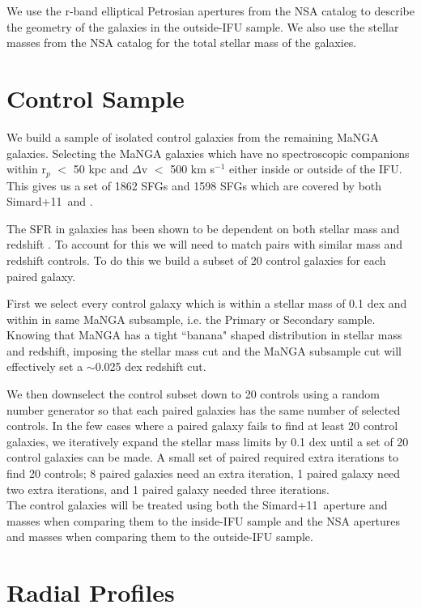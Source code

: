 \documentclass[iop,revtex4,twocolumn,apj,numberedappendix,appendixfloats]{emulateapj}
\newcommand{\simard}{Simard+11}
\begin{document}
We use the r-band elliptical Petrosian apertures from the NSA catalog to describe the geometry of the galaxies in the outside-IFU sample. We also use the stellar masses from the NSA catalog for the total stellar mass of the galaxies. 

\section{Control Sample}\label{sec:control}
We build a sample of isolated control galaxies from the remaining MaNGA galaxies. Selecting the MaNGA galaxies which have no spectroscopic companions within r$_p$ $<$ 50 kpc and $\Delta$v $<$ 500 km s$^{-1}$ either inside or outside of the IFU. This gives us a set of 1862 SFGs and 1598 SFGs which are covered by both \simard\ and \citet{Mendel:2014}. 

The SFR in galaxies has been shown to be dependent on both stellar mass and redshift \citep{Noeske:2007}. To account for this we will need to match pairs with similar mass and redshift controls. To do this we build a subset of 20 control galaxies for each paired galaxy. 

First we select every control galaxy which is within a stellar mass of 0.1 dex and within in same MaNGA subsample, i.e. the Primary or Secondary sample. Knowing that MaNGA has a tight ``banana" shaped distribution in stellar mass and redshift, imposing the stellar mass cut and the MaNGA subsample cut will effectively set a $\sim$0.025 dex redshift cut.

We then downselect the control subset down to 20 controls using a random number generator so that each paired galaxies has the same number of selected controls. In the few cases where a paired galaxy fails to find at least 20 control galaxies, we iteratively expand the stellar mass limits by 0.1 dex until a set of 20 control galaxies can be made. A small set of paired required extra iterations to find 20 controls; 8 paired galaxies need an extra iteration, 1 paired galaxy need two extra iterations, and 1 paired galaxy needed three iterations. \\

The control galaxies will be treated using both the \simard\ aperture and \citet{Mendel:2014} masses when comparing them to the inside-IFU sample and the NSA apertures and masses when comparing them to the outside-IFU sample. 

\section{Radial Profiles}\label{sec:radial}
\end{document}
